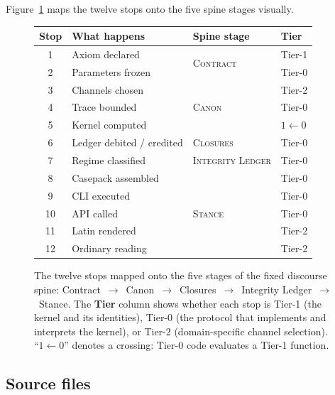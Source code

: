 \documentclass[
  aps,
  prd,
  twocolumn,
  superscriptaddress,
  nofootinbib,
  floatfix
]{revtex4-2}
\begin{document}
Figure~\ref{fig:spine} maps the twelve stops onto the five spine
stages visually.

\begin{figure}[ht]
\centering
\small
\setlength{\tabcolsep}{2pt}
\begin{tabular}{@{}c@{\,}l@{\quad}l@{\quad}l@{}}
  \toprule
  \textbf{Stop} & \textbf{What happens} & \textbf{Spine stage} & \textbf{Tier} \\
  \midrule
  1 & Axiom declared    & \multirow{2}{*}{\textsc{Contract}} & Tier-1 \\
  2 & Parameters frozen  & & Tier-0 \\
  \midrule
  3 & Channels chosen    & \multirow{3}{*}{\textsc{Canon}} & Tier-2 \\
  4 & Trace bounded      & & Tier-0 \\
  5 & Kernel computed    & & $1 \!\leftarrow\! 0$ \\
  \midrule
  6 & Ledger debited / credited & \textsc{Closures} & Tier-0 \\
  \midrule
  7 & Regime classified  & \textsc{Integrity Ledger} & Tier-0 \\
  \midrule
  8 & Casepack assembled & \multirow{5}{*}{\textsc{Stance}} & Tier-0 \\
  9 & CLI executed       & & Tier-0 \\
  10 & API called        & & Tier-0 \\
  11 & Latin rendered    & & Tier-2 \\
  12 & Ordinary reading  & & Tier-2 \\
  \bottomrule
\end{tabular}
\caption{The twelve stops mapped onto the five stages of the
  fixed discourse spine:
  Contract~$\to$~Canon~$\to$~Closures~$\to$~Integrity
  Ledger~$\to$~Stance.  The \textbf{Tier} column shows whether each
  stop is Tier-1 (the kernel and its identities), Tier-0 (the protocol
  that implements and interprets the kernel), or Tier-2 (domain-specific
  channel selection).  ``$1 \!\leftarrow\! 0$'' denotes a crossing:
  Tier-0 code evaluates a Tier-1 function.}
\label{fig:spine}
\end{figure}

\subsection{Source files}
\end{document}
